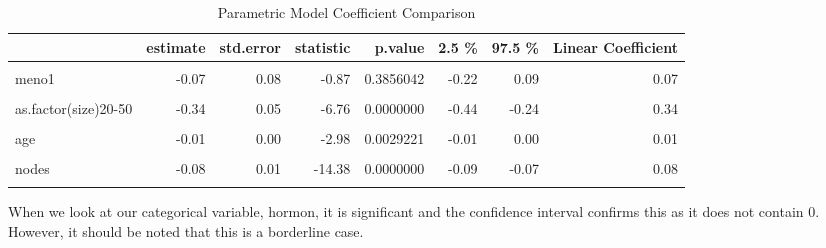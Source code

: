 \documentclass[
]{article}
\begin{document}
\begin{table}[!h]

\caption{\label{tab:CoefficientComparison}Parametric Model Coefficient Comparison}
\centering
\begin{tabular}[t]{lrrrrrrr}
\toprule
  & estimate & std.error & statistic & p.value & 2.5 \% & 97.5 \% & Linear Coefficient\\
\midrule
\cellcolor{gray!6}{(Intercept)} & \cellcolor{gray!6}{9.36} & \cellcolor{gray!6}{0.14} & \cellcolor{gray!6}{65.91} & \cellcolor{gray!6}{0.0000000} & \cellcolor{gray!6}{9.08} & \cellcolor{gray!6}{9.64} & \cellcolor{gray!6}{-9.36}\\
meno1 & -0.07 & 0.08 & -0.87 & 0.3856042 & -0.22 & 0.09 & 0.07\\
\cellcolor{gray!6}{hormon1} & \cellcolor{gray!6}{0.16} & \cellcolor{gray!6}{0.07} & \cellcolor{gray!6}{2.08} & \cellcolor{gray!6}{0.0379496} & \cellcolor{gray!6}{0.01} & \cellcolor{gray!6}{0.30} & \cellcolor{gray!6}{-0.16}\\
as.factor(size)20-50 & -0.34 & 0.05 & -6.76 & 0.0000000 & -0.44 & -0.24 & 0.34\\
\cellcolor{gray!6}{as.factor(size)>50} & \cellcolor{gray!6}{-0.61} & \cellcolor{gray!6}{0.08} & \cellcolor{gray!6}{-7.60} & \cellcolor{gray!6}{0.0000000} & \cellcolor{gray!6}{-0.77} & \cellcolor{gray!6}{-0.45} & \cellcolor{gray!6}{0.61}\\
\addlinespace
age & -0.01 & 0.00 & -2.98 & 0.0029221 & -0.01 & 0.00 & 0.01\\
\cellcolor{gray!6}{as.factor(grade)3} & \cellcolor{gray!6}{-0.27} & \cellcolor{gray!6}{0.05} & \cellcolor{gray!6}{-4.97} & \cellcolor{gray!6}{0.0000007} & \cellcolor{gray!6}{-0.38} & \cellcolor{gray!6}{-0.17} & \cellcolor{gray!6}{0.27}\\
nodes & -0.08 & 0.01 & -14.38 & 0.0000000 & -0.09 & -0.07 & 0.08\\
\cellcolor{gray!6}{pgr} & \cellcolor{gray!6}{0.00} & \cellcolor{gray!6}{0.00} & \cellcolor{gray!6}{4.81} & \cellcolor{gray!6}{0.0000015} & \cellcolor{gray!6}{0.00} & \cellcolor{gray!6}{0.00} & \cellcolor{gray!6}{0.00}\\
\bottomrule
\end{tabular}
\end{table}

When we look at our categorical variable, hormon, it is significant and the confidence interval confirms this as it does not contain 0. However, it should be noted that this is a borderline case.
\end{document}
